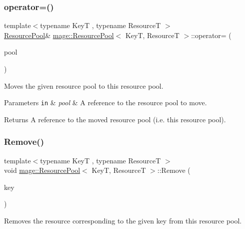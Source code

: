 \subsubsection{\texorpdfstring{operator=()}{operator=()}\hspace{0.1cm}{\footnotesize\ttfamily [2/2]}}
{\footnotesize\ttfamily template$<$typename KeyT , typename ResourceT $>$ \\
\mbox{\hyperlink{classmage_1_1_resource_pool}{Resource\+Pool}}\& \mbox{\hyperlink{classmage_1_1_resource_pool}{mage\+::\+Resource\+Pool}}$<$ KeyT, ResourceT $>$\+::operator= (\begin{DoxyParamCaption}\item[{\mbox{\hyperlink{classmage_1_1_resource_pool}{Resource\+Pool}}$<$ KeyT, ResourceT $>$ \&\&}]{pool }\end{DoxyParamCaption})\hspace{0.3cm}{\ttfamily [delete]}}

Moves the given resource pool to this resource pool.


\begin{DoxyParams}[1]{Parameters}
\mbox{\tt in}  & {\em pool} & A reference to the resource pool to move. \\
\hline
\end{DoxyParams}
\begin{DoxyReturn}{Returns}
A reference to the moved resource pool (i.\+e. this resource pool). 
\end{DoxyReturn}
\mbox{\label{classmage_1_1_resource_pool_a58801a2c21f973e18b84277ddaa60d74}} 
\subsubsection{\texorpdfstring{Remove()}{Remove()}}
{\footnotesize\ttfamily template$<$typename KeyT , typename ResourceT $>$ \\
void \mbox{\hyperlink{classmage_1_1_resource_pool}{mage\+::\+Resource\+Pool}}$<$ KeyT, ResourceT $>$\+::Remove (\begin{DoxyParamCaption}\item[{const KeyT \&}]{key }\end{DoxyParamCaption})}

Removes the resource corresponding to the given key from this resource pool.


